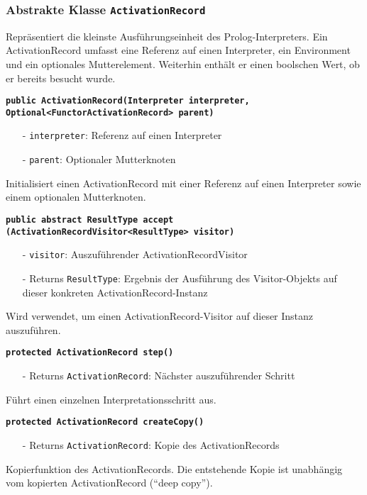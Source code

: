 \documentclass[parskip=full,11pt,twoside]{scrartcl}
\begin{document}
\subsubsection{Abstrakte Klasse \texttt{ActivationRecord}}
Repräsentiert die kleinste Ausführungseinheit des Prolog-Interpreters. Ein ActivationRecord umfasst eine Referenz auf einen Interpreter, ein Environment und ein optionales Mutterelement. Weiterhin enthält er einen boolschen Wert, ob er bereits besucht wurde.

\textbf{\texttt{public ActivationRecord(Interpreter interpreter,\\Optional<FunctorActivationRecord> parent)}}
\begin{itemize}[noitemsep]
	\item[-] \texttt{interpreter}: Referenz auf einen Interpreter
	\item[-] \texttt{parent}: Optionaler Mutterknoten
\end{itemize}
Initialisiert einen ActivationRecord mit einer Referenz auf einen Interpreter sowie einem optionalen Mutterknoten.

\textbf{\texttt{public abstract ResultType accept\\(ActivationRecordVisitor<ResultType> visitor)}}
\begin{itemize}[noitemsep]
	\item[-] \texttt{visitor}: Auszuführender ActivationRecordVisitor
	\item[-] Returns \texttt{ResultType}: Ergebnis der Ausführung des Visitor-Objekts auf dieser konkreten ActivationRecord-Instanz
\end{itemize}
Wird verwendet, um einen ActivationRecord-Visitor auf dieser Instanz auszuführen.

\textbf{\texttt{protected ActivationRecord step()}}
\begin{itemize}[noitemsep]
	\item[-] Returns \texttt{ActivationRecord}: Nächster auszuführender Schritt
\end{itemize}
Führt einen einzelnen Interpretationsschritt aus.

\textbf{\texttt{protected ActivationRecord createCopy()}}
\begin{itemize}[noitemsep]
	\item[-] Returns \texttt{ActivationRecord}: Kopie des ActivationRecords
\end{itemize}
Kopierfunktion des ActivationRecords. Die entstehende Kopie ist unabhängig vom kopierten ActivationRecord (\enquote{deep copy}).
\end{document}
